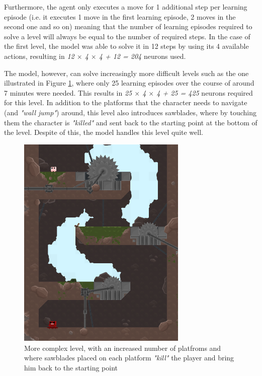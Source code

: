 \documentclass[10pt]{article}
\begin{document}
    Furthermore, the agent only executes a move for 1 additional step per learning episode (i.e. it executes 1 move in the first learning episode, 2 moves in the second one and so on) meaning that the number of learning episodes required to solve a level will always be equal to the number of required steps. In the case of the first level, the model was able to solve it in 12 steps by using its 4 available actions, resulting in \textit{12 $\times$ 4 $\times$ 4 + 12 = 204} neurons used.

    The model, however, can solve increasingly more difficult levels such as the one illustrated in Figure \ref{fig:complexLevel}, where only 25 learning episodes over the course of around 7 minutes were needed. This results in \textit{25 $\times$ 4 $\times$ 4 + 25 = 425} neurons required for this level. In addition to the platforms that the character needs to navigate (and \textit{"wall jump"}) around, this level also introduces sawblades, where by touching them the character is \textit{"killed"} and sent back to the starting point at the bottom of the level. Despite of this, the model handles this level quite well.

    \begin{figure}[ht!]
    \centering
    \includegraphics[width=81mm]{./bladeLevelLong.png}
    \caption{More complex level, with an increased number of platfroms and where sawblades placed on each platform \textit{"kill"} the player and bring him back to the starting point}
    \label{fig:complexLevel}
    \end{figure}
\end{document}
